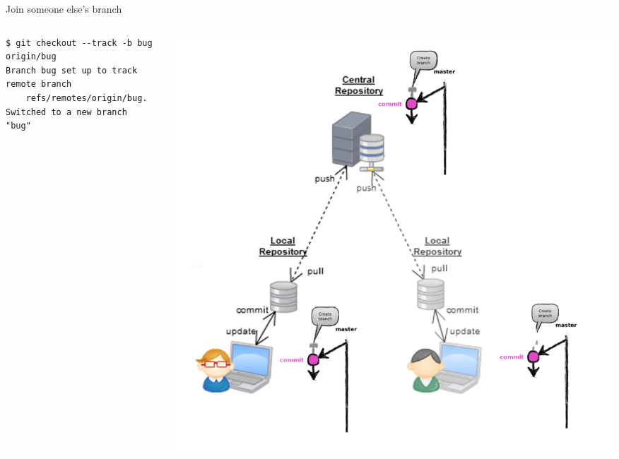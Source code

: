 \begin{frame}[fragile]{Join someone else's branch}
\begin{columns}
	\begin{column}{0.4\textwidth}
	\begin{lstlisting}
$ git checkout --track -b bug origin/bug
Branch bug set up to track remote branch 
	refs/remotes/origin/bug.
Switched to a new branch "bug"
	\end{lstlisting}
	\end{column}
	\begin{column}{0.6\textwidth}
		\begin{center}
			\includegraphics[width=.9\textwidth]{multiuser_track.png}
		\end{center}
	\end{column}
\end{columns}
\end{frame}


